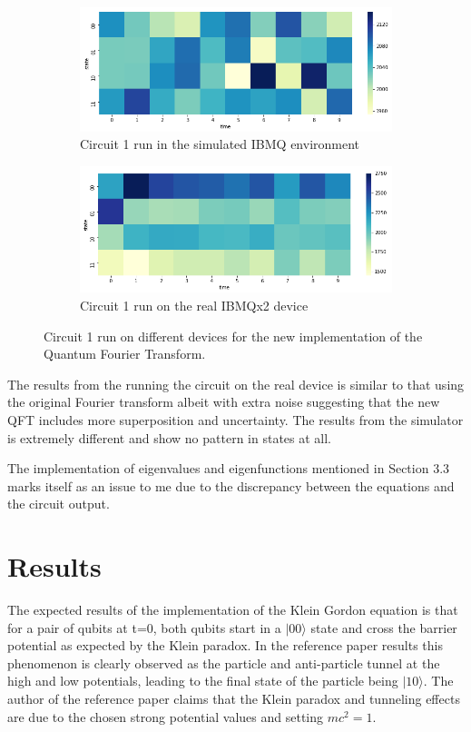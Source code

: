 \documentclass{article}
\begin{document}
\begin{figure}
\centering
\begin{subfigure}{.5\textwidth}
  \centering
  \includegraphics[width=0.9\linewidth]{../images/circ1_heatmap_sim_qftnew}
  \caption{Circuit 1 run in the simulated IBMQ environment}
  \label{fig:sub1}
\end{subfigure}%
\begin{subfigure}{.5\textwidth}
  \centering
  \includegraphics[width=0.9\linewidth]{../images/circ1_heatmap_real_qftnew}
  \caption{Circuit 1 run on the real IBMQx2 device}
  \label{fig:sub2}
\end{subfigure}
\caption{Circuit 1 run on different devices for the new implementation of the Quantum Fourier Transform.}
\label{fig:test}
\end{figure}

The results from the running the circuit on the real device is similar to that using the original Fourier transform albeit with extra noise suggesting that the new QFT includes more superposition and uncertainty. The results from the simulator is extremely different and show no pattern in states at all.

The implementation of eigenvalues and eigenfunctions mentioned in Section 3.3 marks itself as an issue to me due to the discrepancy between the equations and the circuit output. 

\section{Results}
The expected results of the implementation of the Klein Gordon equation is that for a pair of qubits at t=0, both qubits start in a $|00\rangle$ state and cross the barrier potential as expected by the Klein paradox. In the reference paper results this phenomenon is clearly observed as the particle and anti-particle tunnel at the high and low potentials, leading to the final state of the particle being $|10\rangle$. The author of the reference paper claims that the Klein paradox and tunneling effects are due to the chosen strong potential values and setting $mc^2=1$. 
\end{document}
